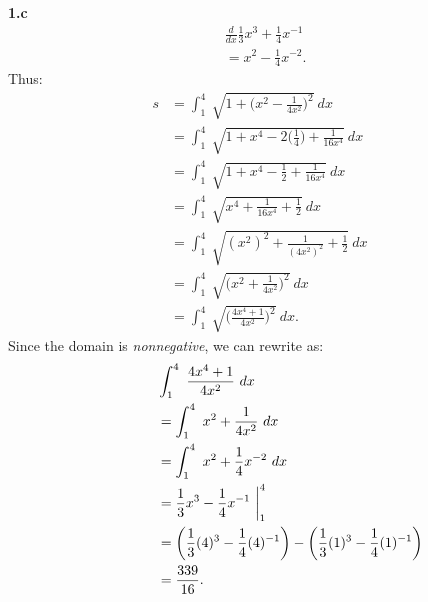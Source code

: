 \documentclass{report}
\begin{document}
    \pagebreak \bigbreak \noindent 
    \textbf{1.c}
    \bigbreak \noindent 
    \begin{align*}
        &\frac{d}{dx}\frac{1}{3}x^{3}+\frac{1}{4}x^{-1}\\
        &=x^{2}-\frac{1}{4}x^{-2}
    .\end{align*}
    \bigbreak \noindent 
    Thus:
    \begin{align*}
        s &= \int_{1}^{4}\ \sqrt{1+\bigg(x^{2}-\frac{1}{4x^{2}}\bigg)^{2}}\ dx \\
          &=\int_{1}^{4}\ \sqrt{1+x^{4}-2\bigg(\frac{1}{4}\bigg)+\frac{1}{16x^{4}}}\ dx \\
          &=\int_{1}^{4}\ \sqrt{1+x^{4}-\frac{1}{2}+\frac{1}{16x^{4}}}\ dx \\
          &=\int_{1}^{4}\ \sqrt{x^{4}+\frac{1}{16x^{4}}+\frac{1}{2}}\ dx \\
          &= \int_{1}^{4}\ \sqrt{(x^{2})^{2}+\frac{1}{(4x^{2})^{2}}+\frac{1}{2}}\ dx \\
          &=\int_{1}^{4}\ \sqrt{\bigg(x^{2}+\frac{1}{4x^{2}}\bigg)^{2}}\ dx \\
          &=\int_{1}^{4}\ \sqrt{\bigg(\frac{4x^{4}+1}{4x^{2}}\bigg)^{2}}\ dx
    .\end{align*}
    \bigbreak \noindent 
    Since the domain is \textit{nonnegative}, we can rewrite as:
    \begin{align*}
        \hspace{0.6in} &\int_{1}^{4}\ \frac{4x^{4}+1}{4x^{2}}\ dx \\
        &=\int_{1}^{4}\ x^{2}+\frac{1}{4x^{2}}\ dx \\
        &=\int_{1}^{4}\ x^{2}+\frac{1}{4}x^{-2}\ dx \\
        &=\frac{1}{3}x^{3}-\frac{1}{4}x^{-1}\ \bigg|_1^{4} \\
        &= \bigg(\frac{1}{3}(4)^{3}-\frac{1}{4}(4)^{-1}\bigg) - \bigg(\frac{1}{3}(1)^{3}-\frac{1}{4}(1)^{-1}\bigg) \\
        &= \frac{339}{16}
    .\end{align*}
\end{document}
